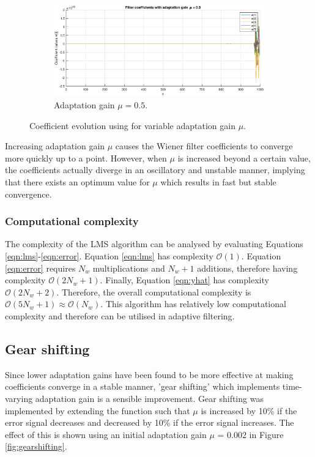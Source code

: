 \begin{figure}[H]
\begin{subfigure}{.45\textwidth}
  \centering
  \includegraphics[width=\linewidth]{assignment4figs/mu05.eps}  
  \caption{Adaptation gain $\mu = 0.5$.}
\end{subfigure}
\caption{Coefficient evolution using  for variable adaptation gain $\mu$.}
\label{fig:mu}
\end{figure}

\noindent
Increasing adaptation gain $\mu$ causes the Wiener filter coefficients to converge more quickly up to a point. However, when $\mu$ is increased beyond a certain value, the coefficients actually diverge in an oscillatory and unstable manner, implying that there exists an optimum value for $\mu$ which results in fast but stable convergence.

\subsubsection{Computational complexity}

The complexity of the LMS algorithm can be analysed by evaluating Equations \ref{eqn:lms}-\ref{eqn:error}. Equation \ref{eqn:lms} has complexity $\mathcal{O}(1)$. Equation \ref{eqn:error} requires $N_{w}$ multiplications and $N_{w}+1$ additions, therefore having complexity $\mathcal{O}(2N_{w}+1)$. Finally, Equation \ref{eqn:yhat} has complexity $\mathcal{O}(2N_{w}+2)$. Therefore, the overall computational complexity is $\mathcal{O}(5N_{w}+1) \approx \mathcal{O}(N_{w})$. This algorithm has relatively low computational complexity and therefore can be utilised in adaptive filtering. 

\subsection{Gear shifting}

Since lower adaptation gains have been found to be more effective at making coefficients converge in a stable manner, 'gear shifting' which implements time-varying adaptation gain is a sensible improvement. Gear shifting was implemented by extending the  function such that $\mu$ is increased by 10\% if the error signal decreases and decreased by 10\% if the error signal increases. The effect of this is shown using an initial adaptation gain $\mu$ = 0.002 in Figure \ref{fig:gearshifting}.

